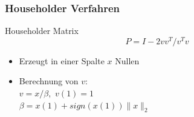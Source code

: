 \documentclass{beamer}
\begin{document}
\begin{frame}
  \frametitle{Householder Verfahren}
  \begin{block}{Householder Matrix}
    \[ P = I - 2vv^T / v^Tv \]    
    \begin{itemize}
    \item Erzeugt in einer Spalte $x$ Nullen
    \end{itemize}
  \end{block}
  
  \begin{itemize}
  \item Berechnung von $v$:\\
    $v = x / \beta,$\hspace{1cm} $v(1) = 1$ \\
    $\beta = x(1) + sign(x(1)) \|x\|_2$
  \end{itemize}

\end{frame}
\end{document}
